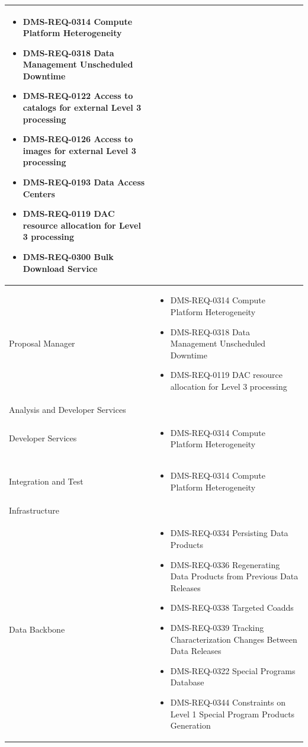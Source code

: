 \documentclass[DM,lsstdraft,toc]{lsstdoc}
\begin{document}
\begin{xtabular}{|p{0.1\textwidth}|p{0.85\textwidth}|}
\begin{itemize}
\item DMS-REQ-0314 Compute Platform Heterogeneity
\item DMS-REQ-0318 Data Management Unscheduled Downtime
\item DMS-REQ-0122 Access to catalogs for external Level 3 processing
\item DMS-REQ-0126 Access to images for external Level 3 processing
\item DMS-REQ-0193 Data Access Centers
\item DMS-REQ-0119 DAC resource allocation for Level 3 processing
\item DMS-REQ-0300 Bulk Download Service \end{itemize} \\ \hline
Proposal Manager &
\begin{itemize} \item DMS-REQ-0314 Compute Platform Heterogeneity
\item DMS-REQ-0318 Data Management Unscheduled Downtime
\item DMS-REQ-0119 DAC resource allocation for Level 3 processing \end{itemize} \\ \hline
Analysis and Developer Services &
\\ \hline
Developer Services &
\begin{itemize} \item DMS-REQ-0314 Compute Platform Heterogeneity \end{itemize} \\ \hline
Integration and Test &
\begin{itemize} \item DMS-REQ-0314 Compute Platform Heterogeneity \end{itemize} \\ \hline
Infrastructure &
\\ \hline
Data Backbone &
\begin{itemize} \item DMS-REQ-0334 Persisting Data Products
\item DMS-REQ-0336 Regenerating Data Products from Previous Data Releases
\item DMS-REQ-0338 Targeted Coadds
\item DMS-REQ-0339 Tracking Characterization Changes Between Data Releases
\item DMS-REQ-0322 Special Programs Database
\item DMS-REQ-0344 Constraints on Level 1 Special Program Products Generation

\end{itemize}
\end{xtabular}
\end{document}
